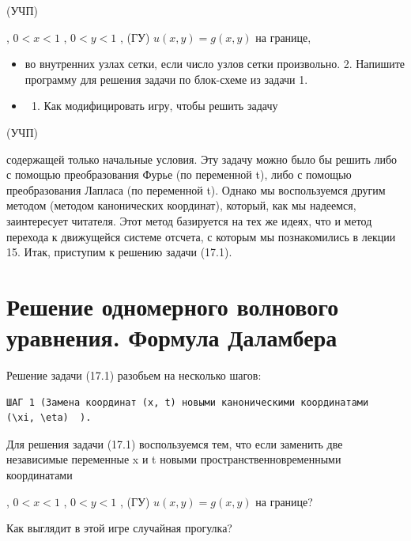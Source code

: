 \documentclass[
  ukrainian,
]{article}
\providecommand{\tightlist}{%
  \setlength{\itemsep}{0pt}\setlength{\parskip}{0pt}}
\begin{document}
(УЧП)

, \(0 < x < 1\) , \(0 < y < 1\) , (ГУ) \(u(x, y) = g(x, y)\) на границе,

\begin{itemize}
\tightlist
\item
  во внутренних узлах сетки, если число узлов сетки произвольно. 2.
  Напишите программу для решения задачи по блок-схеме из задачи 1.
\item
  \begin{enumerate}
  \def\labelenumi{\arabic{enumi}.}
  \setcounter{enumi}{2}
  \tightlist
  \item
    Как модифицировать игру, чтобы решить задачу
  \end{enumerate}
\end{itemize}

(УЧП)

содержащей только начальные условия. Эту задачу можно было бы решить
либо с помощью преобразования Фурье (по переменной t), либо с помощью
преобразования Лапласа (по переменной t). Однако мы воспользуемся другим
методом (методом канонических координат), который, как мы надеемся,
заинтересует читателя. Этот метод базируется на тех же идеях, что и
метод перехода к движущейся системе отсчета, с которым мы познакомились
в лекции 15. Итак, приступим к решению задачи (17.1).

\section{Решение одномерного волнового уравнения. Формула
Даламбера}\label{ux440ux435ux448ux435ux43dux438ux435-ux43eux434ux43dux43eux43cux435ux440ux43dux43eux433ux43e-ux432ux43eux43bux43dux43eux432ux43eux433ux43e-ux443ux440ux430ux432ux43dux435ux43dux438ux44f.-ux444ux43eux440ux43cux443ux43bux430-ux434ux430ux43bux430ux43cux431ux435ux440ux430}

Решение задачи (17.1) разобьем на несколько шагов:

\begin{verbatim}
ШАГ 1 (Замена координат (x, t) новыми каноническими координатами   (\xi, \eta)  ).
\end{verbatim}

Для решения задачи (17.1) воспользуемся тем, что если заменить две
независимые переменные x и t новыми пространственновременными
координатами

, \(0 < x < 1\) , \(0 < y < 1\) , (ГУ) \(u(x, y) = g(x, y)\) на границе?

Как выглядит в этой игре случайная прогулка?
\end{document}

